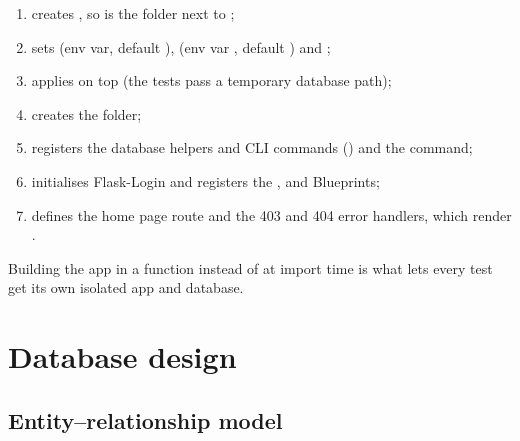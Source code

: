 \documentclass[11pt,a4paper]{article}
\begin{document}
\begin{enumerate}
  \item creates , so 
        is the  folder next to ;
  \item sets  (env var, default ), 
        (env var , default ) and
        ;
  \item applies  on top (the tests pass a temporary database path);
  \item creates the  folder;
  \item registers the database helpers and CLI commands () and the 
        command;
  \item initialises Flask-Login and registers the ,  and 
        Blueprints;
  \item defines the home page route \route{/} and the 403 and 404 error handlers, which render
        .
\end{enumerate}

Building the app in a function instead of at import time is what lets every test get its own
isolated app and database.

\section{Database design}

\subsection{Entity--relationship model}
\end{document}
